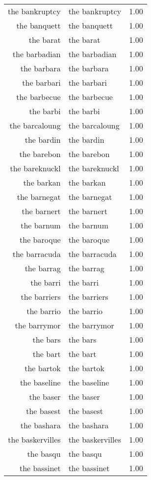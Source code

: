 \begin{table}[ht]
\begin{tabular}{rlr}
  the bankruptcy & the bankruptcy & 1.00 \\ 
  the banquett & the banquett & 1.00 \\ 
  the barat & the barat & 1.00 \\ 
  the barbadian & the barbadian & 1.00 \\ 
  the barbara & the barbara & 1.00 \\ 
  the barbari & the barbari & 1.00 \\ 
  the barbecue & the barbecue & 1.00 \\ 
  the barbi & the barbi & 1.00 \\ 
  the barcaloung & the barcaloung & 1.00 \\ 
  the bardin & the bardin & 1.00 \\ 
  the barebon & the barebon & 1.00 \\ 
  the bareknuckl & the bareknuckl & 1.00 \\ 
  the barkan & the barkan & 1.00 \\ 
  the barnegat & the barnegat & 1.00 \\ 
  the barnert & the barnert & 1.00 \\ 
  the barnum & the barnum & 1.00 \\ 
  the baroque & the baroque & 1.00 \\ 
  the barracuda & the barracuda & 1.00 \\ 
  the barrag & the barrag & 1.00 \\ 
  the barri & the barri & 1.00 \\ 
  the barriers & the barriers & 1.00 \\ 
  the barrio & the barrio & 1.00 \\ 
  the barrymor & the barrymor & 1.00 \\ 
  the bars & the bars & 1.00 \\ 
  the bart & the bart & 1.00 \\ 
  the bartok & the bartok & 1.00 \\ 
  the baseline & the baseline & 1.00 \\ 
  the baser & the baser & 1.00 \\ 
  the basest & the basest & 1.00 \\ 
  the bashara & the bashara & 1.00 \\ 
  the baskervilles & the baskervilles & 1.00 \\ 
  the basqu & the basqu & 1.00 \\ 
  the bassinet & the bassinet & 1.00 \\ 

\end{tabular}
\end{table}
